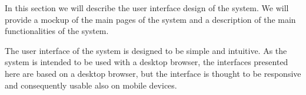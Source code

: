 %
In this section we will describe the user interface design of the system. We will provide a mockup of the main pages of the system and a description of the main functionalities of the system.

The user interface of the system is designed to be simple and intuitive. As the system is intended to be used with a desktop browser, the interfaces presented here are based on a desktop browser, but the interface is thought to be responsive and consequently usable also on mobile devices.\\